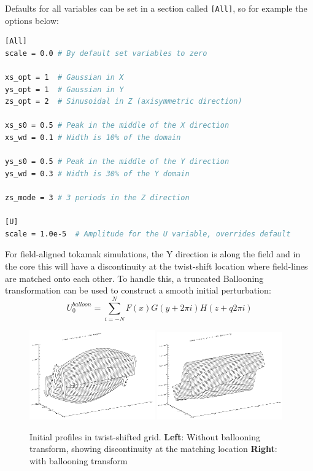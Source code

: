 \documentclass[12pt]{article}
\newcommand{\code}[1]{\texttt{#1}}
\begin{document}
Defaults for all variables can be set in a section called \code{[All]},
so for example the options below:
\begin{lstlisting}[language=bash,numbers=none]
[All]
scale = 0.0 # By default set variables to zero

xs_opt = 1  # Gaussian in X
ys_opt = 1  # Gaussian in Y
zs_opt = 2  # Sinusoidal in Z (axisymmetric direction)

xs_s0 = 0.5 # Peak in the middle of the X direction 
xs_wd = 0.1 # Width is 10% of the domain 

ys_s0 = 0.5 # Peak in the middle of the Y direction
ys_wd = 0.3 # Width is 30% of the Y domain

zs_mode = 3 # 3 periods in the Z direction

[U]
scale = 1.0e-5  # Amplitude for the U variable, overrides default
\end{lstlisting}

For field-aligned tokamak simulations, the Y direction is along the
field and in the core this will have a discontinuity at the twist-shift
location where field-lines are matched onto each other. To handle this,
a truncated Ballooning transformation can be used to construct a smooth
initial perturbation:
\[
U_0^{balloon} = \sum_{i=-N}^N F\left(x\right)G\left(y + 2\pi i\right)H\left(z + q2\pi i\right)
\]

\begin{figure}[h]
\includegraphics[width=0.48\textwidth, keepaspectratio]{figs/init_noballoon.png}
\includegraphics[width=0.48\textwidth, keepaspectratio]{figs/init_balloon.png}
\caption{Initial profiles in twist-shifted grid. {\bf Left}: Without ballooning transform, showing discontinuity at the matching location {\bf Right}: with ballooning transform}
\end{figure}
\end{document}
